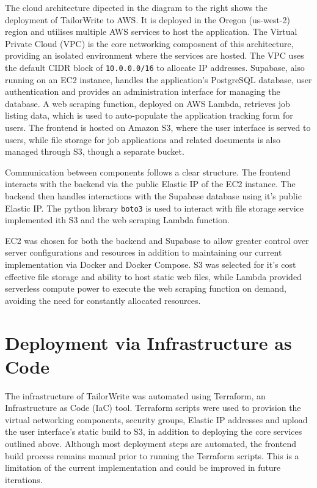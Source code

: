 \documentclass[a4paper, 11pt]{article}
\begin{document}
The cloud architecture dipected in the diagram to the right shows the deployment of TailorWrite to AWS. It is deployed in the Oregon (us-west-2) region and utilises multiple AWS services to host the application. The Virtual Private Cloud (VPC) is the core networking composnent of this architecture, providing an isolated environment where the services are hosted. The VPC uses the default CIDR block of \texttt{10.0.0.0/16} to allocate IP addresses. Supabase, also running on an EC2 instance, handles the application's PostgreSQL database, user authentication and provides an administration interface for managing the database. A web scraping function, deployed on AWS Lambda, retrieves job listing data, which is used to auto-populate the application tracking form for users. The frontend is hosted on Amazon S3, where the user interface is served to users, while file storage for job applications and related documents is also managed through S3, though a separate bucket.

Communication between components follows a clear structure. The frontend interacts with the backend via the public Elastic IP of the EC2 instance. The backend then handles interactions with the Supabase database using it's public Elastic IP. The python library \texttt{boto3} is used to interact with file storage service implemented ith S3 and the web scraping Lambda function. 


EC2 was chosen for both the backend and Supabase to allow greater control over server configurations and resources in addition to maintaining our current implementation via Docker and Docker Compose. S3 was selected for it's cost effective file storage and ability to host static web files, while Lambda provided serverless compute power to execute the web scraping function on demand, avoiding the need for constantly allocated resources. 

\section{Deployment via Infrastructure as Code}

The infrastructure of TailorWrite was automated using Terraform, an Infrastructure as Code (IaC) tool. Terraform scripts were used to provision the virtual networking components, security groups, Elastic IP addresses and upload the user interface's static build to S3, in addition to deploying the core services outlined above. Although most deployment steps are automated, the frontend build process remains manual prior to running the Terraform scripts. This is a limitation of the current implementation and could be improved in future iterations.
\end{document}
